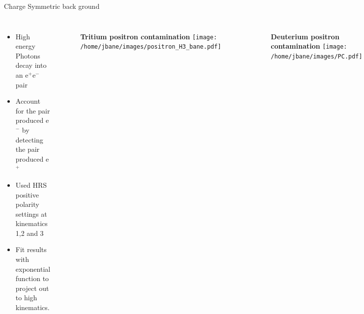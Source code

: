 \documentclass{beamer}
\begin{document}
\begin{frame}{Charge Symmetric back ground}
\begin{block}{}
	\begin{columns}
		\begin{itemize}
			\item High energy Photons decay into an e$^+$e$^-$ pair
			\item Account for the pair produced e$^-$ by detecting the pair produced e$^+$
			\item Used HRS positive polarity settings at kinematics 1,2 and 3
			\item Fit results with exponential function to project out to high kinematics.
		\end{itemize}
		\vspace{-12pt}
		\begin{figure}
			\textbf{Tritium positron contamination}
			\texttt{[image: /home/jbane/images/positron\_H3\_bane.pdf]}
		\end{figure}
			\vspace{-20pt}
		\begin{figure}
			\textbf{Deuterium positron contamination}
			\texttt{[image: /home/jbane/images/PC.pdf]}
		\end{figure}
	\end{columns}
	
\end{block}
\end{frame}
\end{document}
